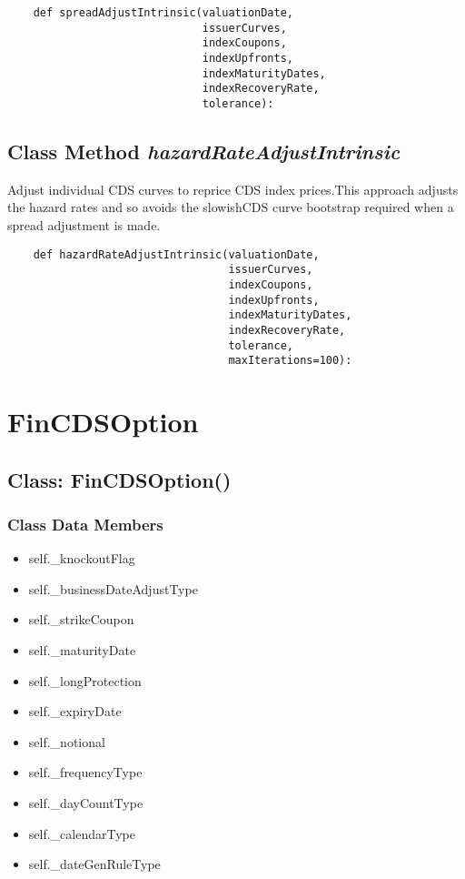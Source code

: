 \documentclass[twoside,11pt]{book}
\begin{document}
\begin{lstlisting}
    def spreadAdjustIntrinsic(valuationDate,
                              issuerCurves,
                              indexCoupons,
                              indexUpfronts,
                              indexMaturityDates,
                              indexRecoveryRate,
                              tolerance):
\end{lstlisting}

\subsection{Class Method {\it hazardRateAdjustIntrinsic}}
Adjust individual CDS curves to reprice CDS index prices.This approach adjusts the hazard rates and so avoids the slowishCDS curve bootstrap required when a spread adjustment is made.

\begin{lstlisting}
    def hazardRateAdjustIntrinsic(valuationDate,
                                  issuerCurves,
                                  indexCoupons,
                                  indexUpfronts,
                                  indexMaturityDates,
                                  indexRecoveryRate,
                                  tolerance,
                                  maxIterations=100):
\end{lstlisting}

\newpage
\section{FinCDSOption}

\subsection{Class: FinCDSOption()}


\subsubsection{Class Data Members}
\begin{itemize}
\item{self.\_knockoutFlag}
\item{self.\_businessDateAdjustType}
\item{self.\_strikeCoupon}
\item{self.\_maturityDate}
\item{self.\_longProtection}
\item{self.\_expiryDate}
\item{self.\_notional}
\item{self.\_frequencyType}
\item{self.\_dayCountType}
\item{self.\_calendarType}
\item{self.\_dateGenRuleType}
\end{itemize}
\end{document}
